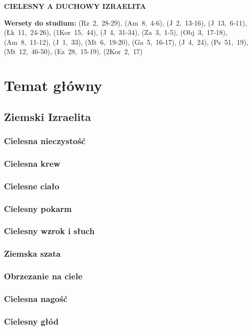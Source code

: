\documentclass[10pt,a4paper,oneside]{article}
\begin{document}
\centerline{\textbf{\MakeUppercase{Cielesny a duchowy Izraelita}}}
\begin{center}
\textbf{Wersety do studium:} \mbox{(Rz 2, 28-29)}, \mbox{(Am 8, 4-6)}, \mbox{(J 2, 13-16)}, \mbox{(J 13, 6-11)}, \mbox{(Łk 11, 24-26)}, \mbox{(1Kor 15, 44)}, \mbox{(J 4, 31-34)}, \mbox{(Za 3, 1-5)}, \mbox{(Obj 3, 17-18)}, \mbox{(Am 8, 11-12)}, \mbox{(J 1, 33)}, \mbox{(Mt 6, 19-20)}, \mbox{(Ga 5, 16-17)}, \mbox{(J 4, 24)}, \mbox{(Ps 51, 19)}, \mbox{(Mt 12, 46-50)}, \mbox{(Ez 28, 15-19)}, \mbox{(2Kor 2, 17)}
\end{center}
\section{Temat główny}
\subsection{Ziemski Izraelita}
\subsubsection{Cielesna nieczystość}
\subsubsection{Cielesna krew}
\subsubsection{Cielesne ciało}
\subsubsection{Cielesny pokarm}
\subsubsection{Cielesny wzrok i słuch}
\subsubsection{Ziemska szata}
\subsubsection{Obrzezanie na ciele}
\subsubsection{Cielesna nagość}
\subsubsection{Cielesny głód}
\end{document}
